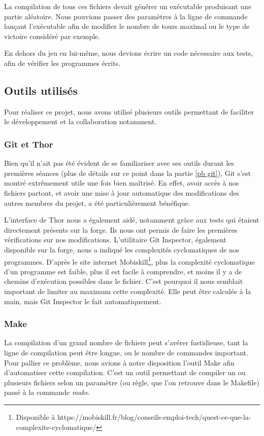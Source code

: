 \documentclass[a4paper]{article}
\begin{document}
La compilation de tous ces fichiers devait générer un exécutable produisant une partie aléatoire. Nous pouvions passer des paramètres à la ligne de commande lançant l'exécutable afin de modifier le nombre de tours maximal ou le type de victoire considéré par exemple.

En dehors du jeu en lui-même, nous devions écrire un code nécessaire aux tests, afin de vérifier les programmes écrits.

\subsection{Outils utilisés}
\label{outils}
Pour réaliser ce projet, nous avons utilisé plusieurs outils permettant de faciliter le développement et la collaboration notamment.

\subsubsection{Git et Thor}
\label{git}
Bien qu'il n'ait pas été évident de se familiariser avec ses outils durant les premières séances (plus de détails sur ce point dans la partie \ref{pb git}), Git s'est montré extrêmement utile une fois bien maîtrisé. En effet, avoir accès à nos fichiers partout, et avoir une mise à jour automatique des modifications des autres membres du projet, a été particulièrement bénéfique.

L'interface de Thor nous a également aidé, notamment grâce aux tests qui étaient directement présents sur la forge. Ils nous ont permis de faire les premières vérifications sur nos modifications. L'utilitaire Git Inspector, également disponible sur la forge, nous a indiqué les complexités cyclomatiques de nos programmes. D'après le site internet Mobiskill\footnote{Disponible à https://mobiskill.fr/blog/conseils-emploi-tech/quest-ce-que-la-complexite-cyclomatique/}, plus la complexité cyclomatique d'un programme est faible, plus il est facile à comprendre, et moins il y a de chemins d'exécution possibles dans le fichier. C'est pourquoi il nous semblait important de limiter au maximum cette complexité. Elle peut être calculée à la main, mais Git Inspector le fait automatiquement.

\subsubsection{Make}
\label{makefile}
La compilation d'un grand nombre de fichiers peut s'avérer fastidieuse, tant la ligne de compilation peut être longue, ou le nombre de commandes important. Pour pallier ce problème, nous avions à notre disposition l'outil Make afin d'automatiser cette compilation. C'est un outil permettant de compiler un ou plusieurs fichiers selon un paramètre (ou règle, que l'on retrouve dans le Makefile) passé à la commande \emph{make}.
\end{document}
